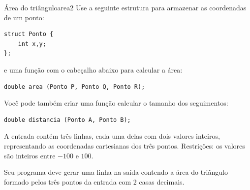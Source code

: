\documentclass[12pt,a4paper,oneside]{article}
\begin{document}
\begin{problem}{Área do triângulo}{area}{2}
Use a seguinte estrutura para armazenar as coordenadas de um ponto:

\begin{lstlisting}
struct Ponto {
    int x,y;
};

\end{lstlisting}

e uma função com o cabeçalho abaixo para calcular a área:

\begin{lstlisting}
double area (Ponto P, Ponto Q, Ponto R);
\end{lstlisting}

Você pode também criar uma função calcular o tamanho dos seguimentos:

\begin{lstlisting}
double distancia (Ponto A, Ponto B);
\end{lstlisting}

\InputFile

A entrada contém três linhas, cada uma delas com dois valores inteiros, representando as coordenadas cartesianas dos três pontos. Restrições: os valores são inteiros entre $-100$ e $100$.

\OutputFile

Seu programa deve gerar uma linha na saída contendo a área do triângulo formado pelos três pontos da entrada com 2 casas decimais.


\Example


\begin{example}
%
\end{example}



\end{problem}
\end{document}
